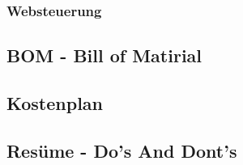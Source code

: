 \documentclass[]{IEEEtran}
\begin{document}
	
		\subsubsection{Websteuerung}
	
	\subsection{BOM - Bill of Matirial}
	
	\subsection{Kostenplan}
	
	\subsection{Resüme - Do's And Dont's}	
\end{document}
